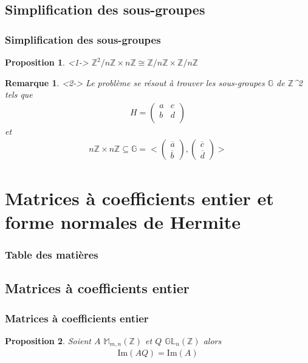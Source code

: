 \documentclass{beamer}
\newtheorem{rmk}{Remarque}
\newtheorem{prp}{Proposition}
\begin{document}
\subsection{Simplification des sous-groupes}
\begin{frame}
\frametitle{Simplification des sous-groupes}
\begin{prp}<1->
    \center $\mathbb{Z}^2/n\mathbb{Z} \times n\mathbb{Z} \cong  \mathbb{Z}/n\mathbb{Z} \times \mathbb{Z}/n\mathbb{Z}$
\end{prp}
\begin{rmk}<2->
    Le problème se résout à trouver les sous-groupes $\mathbb{G}$ de $\mathbb{Z}$^2 tels que
    \begin{align*}
        H = \begin{pmatrix}
            a & c \\
            b & d \\
        \end{pmatrix}
    \end{align*}
    \center et
    \begin{align*}
        n\mathbb{Z} \times n\mathbb{Z} \subseteq \mathbb{G} = < 
            \begin{pmatrix}
                \overline{a} \\
                \overline{b}
            \end{pmatrix}
            ,
            \begin{pmatrix}
                \overline{c} \\
                \overline{d}
            \end{pmatrix}
            >
    \end{align*}
\end{rmk}
\end{frame}


\section{Matrices à coefficients entier et forme normales de Hermite}
\begin{frame}
\frametitle{Table des matières}
\tableofcontents[currentsection]
\end{frame}


\subsection{Matrices à coefficients entier}
\begin{frame}
\frametitle{Matrices à coefficients entier}

\begin{prp}
    Soient $A$ \in $\mathbb{M}_{m,n}(\mathbb{Z})$ et $Q$ \in $\mathbb{GL}_{n}(\mathbb{Z})$ alors
    \begin{align*}
        \mathrm{Im}(AQ) = \mathrm{Im}(A)
    \end{align*}
\end{prp}
\end{frame}
\end{document}
